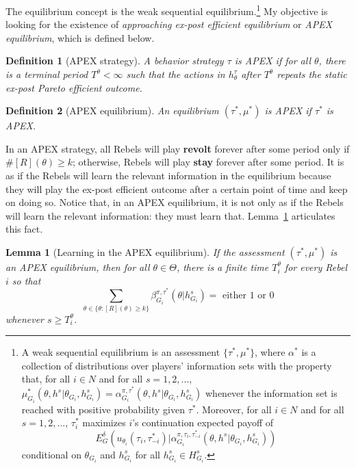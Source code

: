 \documentclass[12pt,letter]{article}
\newtheorem{lemma}{Lemma}[section]
\newtheorem{definition}{Definition}[section]
\theoremstyle{definition}
\theoremstyle{definition}
\theoremstyle{remark}
\theoremstyle{claim}
\begin{document}
The equilibrium concept is the weak sequential equilibrium.\footnote{A weak sequential equilibrium is an assessment $\{\tau^{*}, \mu^{*}\}$, where $\alpha^{*}$ is a collection of distributions over players' information sets with the property that, for all $i\in N$ and for all $s=1,2,...$, $\mu^{*}_{G_i}(\theta, h^{s}|\theta_{G_i},h^{s}_{G_i})=\alpha^{\pi,\tau^{*}}_{G_i}(\theta, h^{s}|\theta_{G_i},h^{s}_{G_i})$ whenever the information set is reached with positive probability given $\tau^{*}$. Moreover, for all $i\in N$ and for all $s=1,2,...$, $\tau^{*}_{i}$ maximizes $i$'s continuation expected payoff of
\[E^{\delta}_G(u_{\theta_i}(\tau_{i},\tau^{*}_{-i})|\alpha^{\pi,\tau_{i},\tau^{*}_{-i}}_{G_i}(\theta, h^{s}|\theta_{G_i},h^{s}_{G_i}))\] conditional on $\theta_{G_i}$ and $h^{s}_{G_i}$ for all $h^{s}_{G_i}\in H^s_{G_i}$.} 
My objective is looking for the existence of \textit{approaching ex-post efficient equilibrium} or \textit{APEX equilibrium}, which is defined below.

\begin{definition}[APEX strategy]
A behavior strategy $\tau$ is APEX  if for all $\theta$, there is a terminal period $T^{\theta}<\infty$ such that the actions in $h^{\tau}_{\theta}$ after $T^{\theta}$ repeats the static ex-post Pareto efficient outcome.
\end{definition}

\begin{definition}[APEX equilibrium]\label{Def_ex-post_efficient}
An equilibrium $(\tau^{*},\mu^{*})$ is APEX if $\tau^{*}$ is APEX.
\end{definition}




In an APEX strategy, all Rebels will play \textbf{revolt} forever after some period only if $\#[R](\theta)\geq k$; otherwise, Rebels will play \textbf{stay} forever after some period. It is as if the Rebels will learn the relevant information in the equilibrium because they will play the ex-post efficient outcome after a certain point of time and keep on doing so. Notice that, in an APEX equilibrium, it is not only as if the Rebels will learn the relevant information: they must learn that. Lemma~\ref{lemma_learn} articulates this fact.

\begin{lemma}[Learning in the APEX equilibrium]\label{lemma_learn}
If the assessment $(\tau^*,\mu^{*})$ is an APEX equilibrium, then for all $\theta\in \Theta$, there is a finite time $T^{\theta}_i$ for every Rebel $i$ so that
\[\sum_{\theta\in\{\theta:[R](\theta)\geq k\}}\beta^{\pi,\tau^*}_{G_i}(\theta|h^{s}_{G_i})= \text{ either } 1 \text{ or } 0\]
whenever $s\geq T^{\theta}_i$.
\end{lemma}
\end{document}
